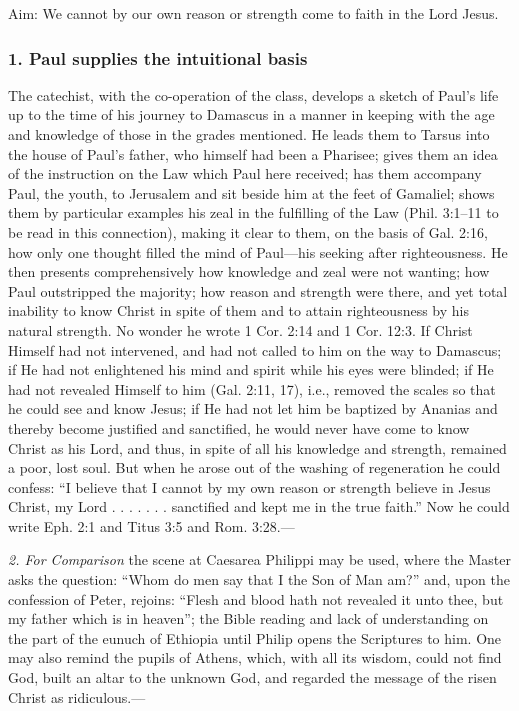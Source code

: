 Aim: We cannot by our own reason or strength come to faith in the Lord Jesus. \subsubsection{1. Paul supplies the intuitional basis} The catechist, with the co-operation of the class, develops a sketch of Paul’s life up to the time of his journey to Damascus in a manner in keeping with the age and knowledge of those in the grades mentioned. He leads them to Tarsus into the house of Paul’s father, who himself had been a Pharisee; gives them an idea of the instruction on the Law which Paul here received; has them accompany Paul,
the youth, to Jerusalem and sit beside him at the feet of Gamaliel; shows them by particular examples his zeal in the fulfilling of the Law (Phil. 3:1–11 to be read in this connection), making it clear to them, on the basis of Gal. 2:16, how only one thought filled the mind of Paul—his seeking after righteousness. He then presents comprehensively how knowledge and zeal were not wanting; how Paul outstripped the majority; how reason and strength were there, and yet total inability to know Christ in spite of them and to attain righteousness by his natural strength. No wonder he wrote 1 Cor. 2:14 and 1 Cor. 12:3. If Christ Himself had not intervened, and had not called to him on the way to Damascus; if He had not enlightened his mind and spirit while his eyes were blinded; if He had not revealed Himself to him (Gal. 2:11, 17), i.e., removed the scales so that he could see and know Jesus; if He had not let him be baptized by Ananias and thereby become justified and sanctified, he would never have come to know Christ as his Lord, and thus, in spite of all his knowledge and strength, remained a poor, lost soul. But when he arose out of the washing of regeneration he could confess: “I believe that I cannot by my own reason or strength believe in Jesus Christ, my Lord . . . . . . . sanctified and kept me in the true faith.” Now he could write Eph. 2:1 and Titus 3:5 and Rom. 3:28.—

\emph{2. For Comparison} the scene at Caesarea Philippi may be used, where the Master asks the question: “Whom do men say that I the Son of Man am?” and, upon the confession of Peter, rejoins: “Flesh and blood hath not revealed it unto thee, but my father which is in heaven”; the Bible reading and lack of understanding on the part of the eunuch of Ethiopia until Philip opens the Scriptures to him. One may also remind the pupils of Athens, which, with all its wisdom, could not find God, built an altar to the unknown God, and regarded the message of the risen Christ as ridiculous.—

